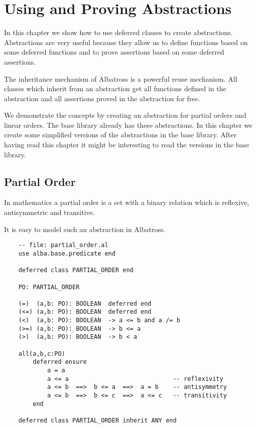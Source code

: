\section{Using and Proving Abstractions}

In this chapter we show how to use deferred classes to create
abstractions. Abstractions are very useful because they allow us to define
functions based on some deferred functions and to prove assertions based on
some deferred assertions.

The inheritance mechanism of Albatross is a powerful reuse mechanism. All
classes which inherit from an abstraction get all functions defined in the
abstraction and all assertions proved in the abstraction for free.

We demonstrate the concepts by creating an abstraction for partial orders and
linear orders. The base library already has these abstractions. In this
chapter we create some simplified versions of the abstractions in the base
library. After having read this chapter it might be interesting to read the
versions in the base library.



\subsection{Partial Order}

In mathematics a partial order is a set with a binary relation which is
reflexive, antisymmetric and transitive.

It is easy to model such an abstraction in Albatross.

\begin{lstlisting}
    -- file: partial_order.al
    use alba.base.predicate end

    deferred class PARTIAL_ORDER end

    PO: PARTIAL_ORDER

    (=)  (a,b: PO): BOOLEAN  deferred end
    (<=) (a,b: PO): BOOLEAN  deferred end
    (<)  (a,b: PO): BOOLEAN  -> a <= b and a /= b
    (>=) (a,b: PO): BOOLEAN  -> b <= a
    (>)  (a,b: PO): BOOLEAN  -> b < a

    all(a,b,c:PO)
        deferred ensure
            a = a
            a <= a                             -- reflexivity
            a <= b  ==>  b <= a  ==>  a = b    -- antisymmetry
            a <= b  ==>  b <= c  ==>  a <= c   -- transitivity
        end

    deferred class PARTIAL_ORDER inherit ANY end
\end{lstlisting}

